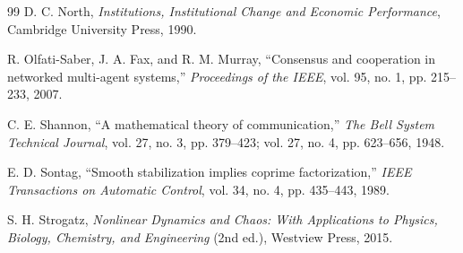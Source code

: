 \documentclass[11pt,a4paper]{article}
\theoremstyle{definition}
\begin{document}
\begin{thebibliography}{99}
 D. C. North, \textit{Institutions, Institutional Change and Economic Performance}, Cambridge University Press, 1990.

 R. Olfati-Saber, J. A. Fax, and R. M. Murray, ``Consensus and cooperation in networked multi-agent systems,'' \textit{Proceedings of the IEEE}, vol. 95, no. 1, pp. 215--233, 2007.

 C. E. Shannon, ``A mathematical theory of communication,'' \textit{The Bell System Technical Journal}, vol. 27, no. 3, pp. 379--423; vol. 27, no. 4, pp. 623--656, 1948.

 E. D. Sontag, ``Smooth stabilization implies coprime factorization,'' \textit{IEEE Transactions on Automatic Control}, vol. 34, no. 4, pp. 435--443, 1989.

 S. H. Strogatz, \textit{Nonlinear Dynamics and Chaos: With Applications to Physics, Biology, Chemistry, and Engineering} (2nd ed.), Westview Press, 2015.

\end{thebibliography}
\end{document}
